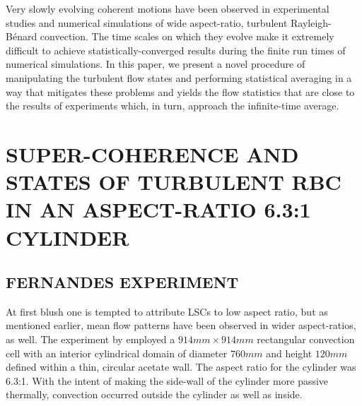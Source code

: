 \documentclass[twocolumn,10pt]{tsfp}
\begin{document}
Very slowly evolving coherent motions have been observed in experimental studies and numerical simulations of wide aspect-ratio, turbulent Rayleigh-B\'{e}nard convection.  The time scales on which they evolve make it extremely difficult to achieve statistically-converged results during the finite run times of numerical simulations. In this paper, we present a novel procedure of manipulating the turbulent flow states and performing statistical averaging in a way that mitigates these problems and yields the flow statistics that are close to the results of experiments which, in turn, approach the infinite-time average.


\section*{SUPER-COHERENCE AND STATES OF TURBULENT RBC IN AN ASPECT-RATIO 6.3:1 CYLINDER}
\vspace{.2in}
\subsection*{FERNANDES EXPERIMENT}
At first blush one is tempted to attribute LSCs to low aspect ratio, but as mentioned earlier, mean flow patterns have been observed in wider aspect-ratios, as well. The experiment by \cite{fernandes2001spatial} employed a $914mm \times  914mm$ rectangular convection cell with an interior cylindrical domain of diameter $760mm$ and height $120mm$ defined within a thin, circular acetate wall. The aspect ratio for the cylinder was 6.3:1. With the intent of making the side-wall of the cylinder more passive thermally, convection occurred outside the cylinder as well as inside. 
\end{document}
